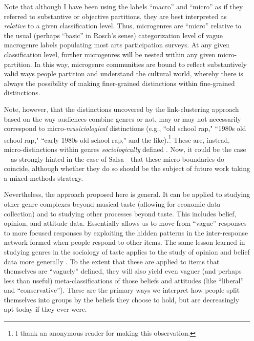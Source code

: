 \documentclass[a4paper,12pt]{extarticle}
\begin{document}
Note that although I have been using the labels ``macro'' and ``micro'' as if they referred to substantive or objective partitions, they are best interpreted as {\em relative} to a given classification level. Thus, microgenres are ``micro'' relative to the usual (perhaps ``basic'' in Rosch's \citeyearpar{Rosch1978-ue} sense) categorization level of vague macrogenre labels populating most arts participation surveys. At any given classification level, further microgenres will be nested within any given micro-partition. In this way, microgenre communities are bound to reflect substantively valid ways people partition and understand the cultural world, whereby there is always the possibility of making finer-grained distinctions within fine-grained distinctions. 

Note, however, that the distinctions uncovered by the link-clustering approach based on the way audiences combine genres or not, may or may not necessarily correspond to micro-\textit{musiciological} distinctions (e.g., ``old school rap," ``1980s old school rap," ``early 1980s old school rap," and the like).\footnote{I thank an anonymous reader for making this observation.} These are, instead, micro-distinctions within genres \textit{sociologically} defined \citep{lena2015relational}. Now, it could be the case---as strongly hinted in the case of Salsa---that these micro-boundaries do coincide, although whether they do so should be the subject of future work taking a mixed-methods strategy. 

Nevertheless, the approach proposed here is general. It can be applied to studying other genre complexes beyond musical taste (allowing for economic data collection) and to studying other processes beyond taste. This includes belief, opinion, and attitude data. Essentially allows us to move from ``vague'' responses to more focused responses by exploiting the hidden patterns in the inter-response network formed when people respond to other items. The same lesson learned in studying genres in the sociology of taste applies to the study of opinion and belief data more generally \citep{boutyline2017belief}. To the extent that these are applied to items that themselves are ``vaguely'' defined, they will also yield even vaguer (and perhaps less than useful) meta-classifications of those beliefs and attitudes (like ``liberal'' and ``conservative''). These are the primary ways we interpret how people split themselves into groups by the beliefs they choose to hold, but are decreasingly apt today if they ever were. 
 


\end{document}

